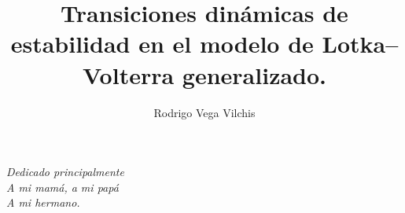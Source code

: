 \documentclass[a4paper,11pt]{book}
\author{Rodrigo Vega Vilchis}
\title{Transiciones dinámicas de estabilidad en el modelo de Lotka--Volterra generalizado.}
\theoremstyle{plain}
\theoremstyle{definition}
\begin{document}
\frontmatter
\maketitle

\begin{flushright}%
	\emph{Dedicado principalmente}\\
	\emph{A mi mamá, a mi papá}\\
	\emph{A mi hermano.}
	\thispagestyle{empty}
\end{flushright}



\tableofcontents
\listoffigures
\listoftables
\listofalgorithms



\mainmatter






\appendix
%
%


\backmatter
\printbibliography

%
\end{document}
